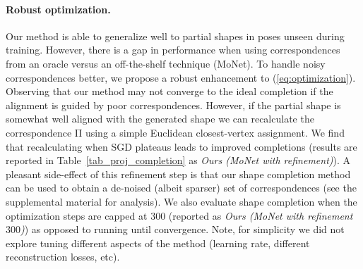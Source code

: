 \documentclass[10pt,twocolumn,letterpaper]{article}
\newcommand{\bb}[1]{\bm{\mathrm{#1}}}
\begin{document}
\paragraph{Robust optimization.}
Our method is able to generalize well to partial shapes in poses unseen during training. However, there is a gap in performance when using correspondences from an oracle versus an off-the-shelf technique (MoNet). To handle noisy correspondences better, we propose a robust enhancement to (\ref{eq:optimization}). Observing that our method may not converge to the ideal completion if the alignment is guided by poor correspondences. However, if the partial shape is somewhat well aligned with the generated shape we can recalculate the correspondence $\bb{\Pi}$ using a simple Euclidean closest-vertex assignment. We find that recalculating when SGD plateaus leads to improved completions (results are reported in Table~\ref{tab_proj_completion} as \emph{Ours (MoNet with refinement)}).
A pleasant side-effect of this refinement step is that our shape completion method can be used to obtain a de-noised (albeit sparser) set  of correspondences (see the supplemental material for analysis).
We also evaluate shape completion when the optimization steps are capped at 300 (reported as \emph{Ours (MoNet with refinement $300$)}) as opposed to running until convergence. Note, for simplicity we did not explore tuning different aspects of the method (learning rate, different reconstruction losses, etc).
\end{document}
